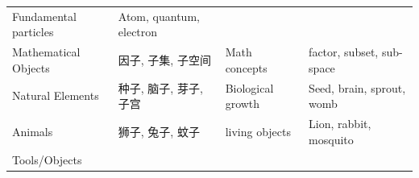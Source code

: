 \begin{longtable}[]{@{}llll@{}}
\begin{minipage}[t]{0.33\columnwidth}
Fundamental particles\strut
\end{minipage} & \begin{minipage}[t]{0.19\columnwidth}\raggedright
Atom, quantum, electron\strut
\end{minipage}\tabularnewline
\begin{minipage}[t]{0.17\columnwidth}\raggedright
Mathematical Objects\strut
\end{minipage} & \begin{minipage}[t]{0.19\columnwidth}\raggedright
因子, 子集, 子空间\strut
\end{minipage} & \begin{minipage}[t]{0.33\columnwidth}\raggedright
Math concepts\strut
\end{minipage} & \begin{minipage}[t]{0.19\columnwidth}\raggedright
factor, subset, sub-space\strut
\end{minipage}\tabularnewline
\begin{minipage}[t]{0.17\columnwidth}\raggedright
Natural Elements\strut
\end{minipage} & \begin{minipage}[t]{0.19\columnwidth}\raggedright
种子, 脑子, 芽子, 子宫\strut
\end{minipage} & \begin{minipage}[t]{0.33\columnwidth}\raggedright
Biological growth\strut
\end{minipage} & \begin{minipage}[t]{0.19\columnwidth}\raggedright
Seed, brain, sprout, womb\strut
\end{minipage}\tabularnewline
\begin{minipage}[t]{0.17\columnwidth}\raggedright
Animals\strut
\end{minipage} & \begin{minipage}[t]{0.19\columnwidth}\raggedright
狮子, 兔子, 蚊子\strut
\end{minipage} & \begin{minipage}[t]{0.33\columnwidth}\raggedright
living objects\strut
\end{minipage} & \begin{minipage}[t]{0.19\columnwidth}\raggedright
Lion, rabbit, mosquito\strut
\end{minipage}\tabularnewline
\begin{minipage}[t]{0.17\columnwidth}\raggedright
Tools/Objects\strut
\end{minipage} & \begin{minipage}[t]{0.19\columnwidth}\raggedright

\end{minipage}
\end{longtable}

